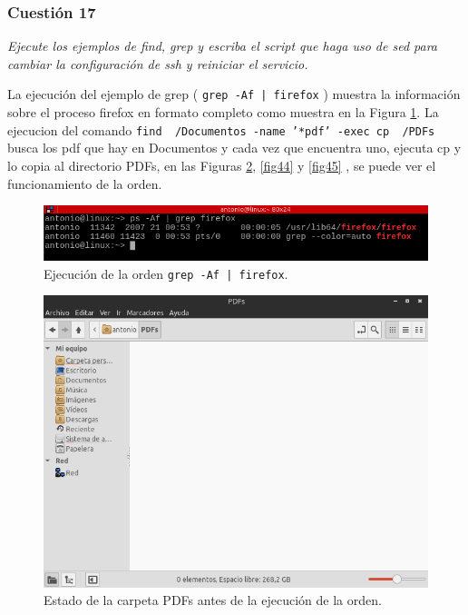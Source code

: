 \subsubsection{Cuestión 17}
\textit{Ejecute los ejemplos de find, grep y escriba el script que haga uso de sed para cambiar la configuración de ssh y reiniciar el servicio.}

La ejecución del ejemplo de grep ( \texttt{grep -Af | firefox} ) muestra la información sobre el proceso firefox en formato completo como muestra en la Figura \ref{fig42}. La ejecucion del comando \texttt{find ~/Documentos -name '*pdf' -exec cp {} ~/PDFs \;} busca los pdf que hay en Documentos y cada vez que encuentra uno, ejecuta cp y lo copia al directorio PDFs, en las Figuras \ref{fig43}, \ref{fig44} y \ref{fig45} , se puede ver el funcionamiento de la orden.

\begin{figure}[H]
    \begin{center}
        \includegraphics[scale=0.6]{imagenes/img45}
        \caption{Ejecución de la orden \texttt{grep -Af | firefox}.}
        \label{fig42}
    \end{center}
\end{figure}

\begin{figure}[H]
    \begin{center}
        \includegraphics[scale=0.5]{imagenes/img46}
        \caption{Estado de la carpeta PDFs antes de la ejecución de la orden.}
        \label{fig43}
    \end{center}
\end{figure}

